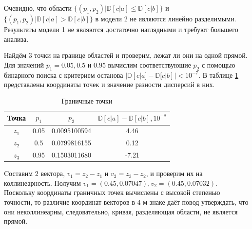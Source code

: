 \documentclass[12pt,a4paper,oneside,fleqn,leqno]{article}
\begin{document}
			Очевидно, что области $\{(p_1, p_2) | \mathbb{D}[c|a] \leqslant \mathbb{D}[c|b] \}$ и $\{(p_1, p_2) | \mathbb{D}[c|a] > \mathbb{D}[c|b] \}$ в модели 2 не являются линейно разделимыми. Результаты модели 1 не являются достаточно наглядными и требуют большего анализа.\par
			Найдём 3 точки на границе областей и проверим, лежат ли они на одной прямой. Для значений $p_1 = 0.05, 0.5$ и $0.95$ вычислим соответствующие $p_2$ с помощью бинарного поиска с критерием останова $|\mathbb{D}[c|a] - \mathbb{D}[c|b]| < 10^{-7}$. В таблице \ref{tab:3points} представлены координаты точек и значение разности дисперсий в них.
			\begin{table}[H]
				\centering
				\begin{tabular}{|c|c|c|c|}
					\hline
					Точка & $p_1$ & $p_2$ & $\mathbb{D}[c|a] - \mathbb{D}[c|b], 10^{-8}$\\
					\hline
					$z_1$ & 0.05 & 0.0095100594 & 4.46\\
					\hline
					$z_2$ & 0.5 & 0.0799816155 & 0.12\\
					\hline
					$z_3$ & 0.95 & 0.1503011680 & -7.21 \\
					\hline
				\end{tabular}
				\caption{Граничные точки}
				\label{tab:3points}
			\end{table}\par
			Cоставим 2 вектора, $v_1 = z_2 - z_1$ и $v_2 = z_3 - z_2$, и проверим их на коллинеарность. Получим $v_1 = (0.45, 0.07047), v_2 = (0.45, 0.07032).$ Поскольку координаты граничных точек вычислены с высокой степенью точности, то различие координат векторов в 4-м знаке даёт повод утверждать, что они неколлинеарны, следовательно, кривая, разделяющая области, не является прямой.
\end{document}
